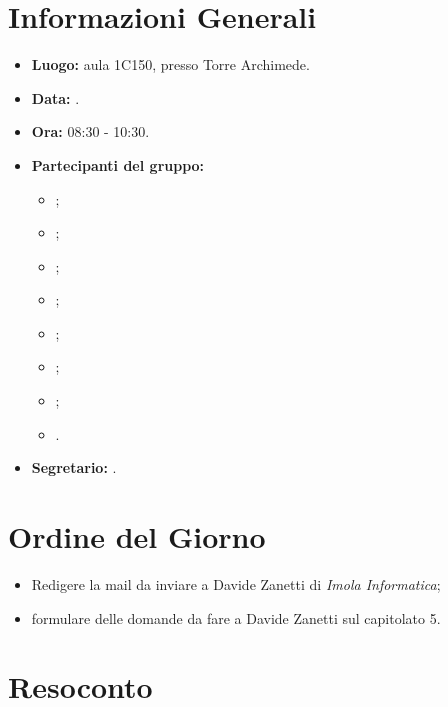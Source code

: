 \section{Informazioni Generali}
\begin{itemize}
\item \textbf{Luogo:} aula 1C150, presso Torre Archimede.
\item \textbf{Data:} \Data.
\item \textbf{Ora:} 08:30 - 10:30.
\item \textbf{Partecipanti del gruppo:}
	\begin{itemize}
		\item \AT; 
		\item \BR;
		\item \CE; 
		\item \DF;
		\item \LD;
		\item \MC;
		\item \PF;
		\item \SE.
	\end{itemize} 
\item \textbf{Segretario:} \PF.
\end{itemize}

\section{Ordine del Giorno}
\begin{itemize}
	\item Redigere la mail da inviare a Davide Zanetti di \textit{Imola Informatica};
	\item formulare delle domande da fare a Davide Zanetti sul capitolato 5.
\end{itemize}

\section{Resoconto}
